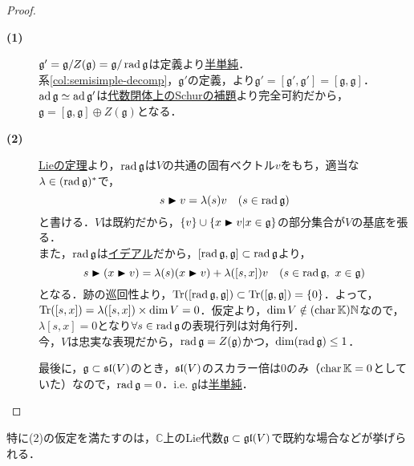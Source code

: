 \documentclass[rep_main]{subfiles}
\begin{document}
\begin{proof}
	\begin{description}
		\item[\textbf{(1)}] $\mathfrak{g}' = \mathfrak{g} / Z(\mathfrak{g}) = \mathfrak{g} / \operatorname{rad}\mathfrak{g}$は定義より\hyperref[def:semisimple-LieAlg]{半単純}．\\
		系\ref{col:semisimple-decomp}，$\mathfrak{g}'$の定義，より$\mathfrak{g}' = [\mathfrak{g}', \mathfrak{g}'] = [\mathfrak{g}, \mathfrak{g}]$．\\
		$\operatorname{ad}\mathfrak{g} \simeq \operatorname{ad} \mathfrak{g}'$は\hyperref[col:Schur-closed]{代数閉体上のSchurの補題}より完全可約だから，$\mathfrak{g} = [\mathfrak{g}, \mathfrak{g}] \oplus Z(\mathfrak{g})$となる．
		\item[\textbf{(2)}] \hyperref[thm:eigen-Lie]{Lieの定理}より，$\operatorname{rad}\mathfrak{g}$は$V$の共通の固有ベクトル$v$をもち，適当な$\lambda \in (\operatorname{rad}\mathfrak{g})^*$で，
		\begin{equation}
			s \blacktriangleright v = \lambda(s)v\quad  (s \in \operatorname{rad}\mathfrak{g})
		\end{equation}
		と書ける．$V$は既約だから，$\{v\} \cup \{x \blacktriangleright v | x \in \mathfrak{g}\}$の部分集合が$V$の基底を張る．\\
		また，$\operatorname{rad}\mathfrak{g}$は\hyperref[def:ideal-LieAlg]{イデアル}だから，$[\operatorname{rad}\mathfrak{g}, \mathfrak{g}] \subset \operatorname{rad}\mathfrak{g}$より，
		\begin{equation}
			\label{eq:rad-Lie-alg}
			s \blacktriangleright(x \blacktriangleright v) = \lambda(s)(x \blacktriangleright v) + \lambda([s, x])v\quad  (s \in \operatorname{rad}\mathfrak{g},\ x \in \mathfrak{g})
		\end{equation}
		となる．跡の巡回性より，$\Tr([\operatorname{rad}\mathfrak{g}, \mathfrak{g}]) \subset \Tr([\mathfrak{g}, \mathfrak{g}]) = \{0\}$．よって，$\Tr([s, x]) = \lambda([s, x]) \times \dim V = 0$．仮定より，$\dim V \notin (\operatorname{char}\mathbb{K})\mathbb{N}$なので，$\lambda[s, x] = 0$となり$\forall s \in \operatorname{rad}\mathfrak{g}$の表現行列は対角行列．\\
		今，$V$は忠実な表現だから，$\operatorname{rad}\mathfrak{g} = Z(\mathfrak{g})$かつ，$\dim(\operatorname{rad}\mathfrak{g}) \leq 1$．
		
		最後に，$\mathfrak{g} \subset \mathfrak{sl}(V)$のとき，$\mathfrak{sl}(V)$のスカラー倍は$0$のみ（$\operatorname{char}\mathbb{K} = 0$としていた）なので，$\operatorname{rad}\mathfrak{g} = 0$．i.e. $\mathfrak{g}$は\hyperref[def:semisimple-LieAlg]{半単純}．
	\end{description}
\end{proof}
特に(2)の仮定を満たすのは，$\mathbb{C}$上のLie代数$\mathfrak{g} \subset \mathfrak{gl}(V)$で既約な場合などが挙げられる．
\end{document}
